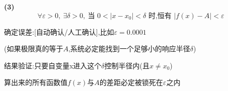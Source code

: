 \documentclass[11pt,a4paper,UTF8]{ctexart}
\begin{document}
\textbf{(3)} 
\begin{equation*}
\forall \varepsilon > 0, \ \exists \delta > 0, \ \text{当 } 0 < \vert{}x - x_0\vert{} < \delta \text{ 时,恒有 } \vert{}f(x) - A\vert{} < \varepsilon
\end{equation*}


\begin{solbox}[{分步推导与答题规范}]
确定误差:[自动确认/人工确认],比如$\varepsilon = 0.0001$

(如果极限真的等于$A$,系统必定能找到一个足够小的响应半径$\delta$)

结果验证:只要自变量x进入这个$\delta$控制半径内(且$x \neq x_0$)

  算出来的所有函数值$f(x)$与$A$的差距必定被锁死在$\varepsilon$之内
\end{solbox}
\end{document}
